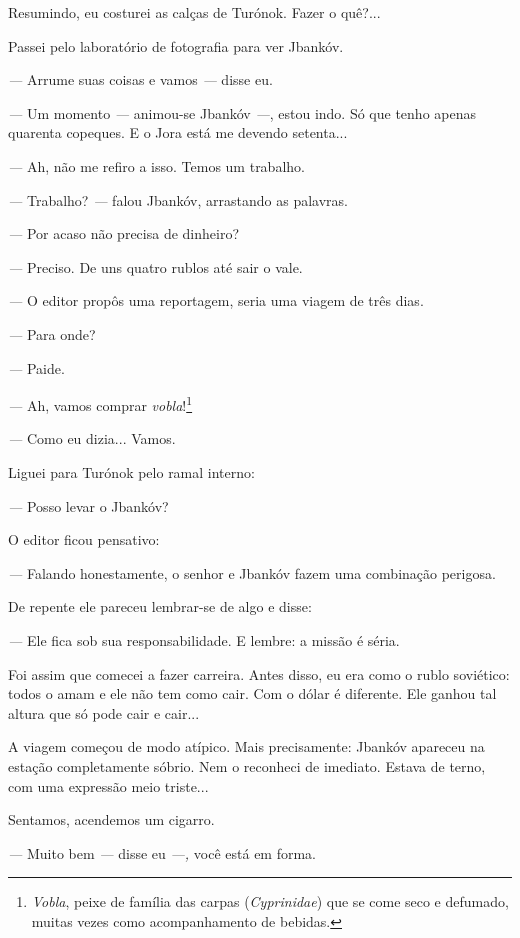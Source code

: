 Resumindo, eu costurei as calças de Turónok. Fazer o quê?...

Passei pelo laboratório de fotografia para ver Jbankóv.

\emph{---} Arrume suas coisas e vamos \emph{---} disse eu.

\emph{---} Um momento \emph{---} animou-se Jbankóv \emph{---}, estou
indo. Só que tenho apenas quarenta copeques. E o Jora está me devendo
setenta...

\emph{---} Ah, não me refiro a isso. Temos um trabalho.

\emph{---} Trabalho? \emph{---} falou Jbankóv, arrastando as palavras.

\emph{---} Por acaso não precisa de dinheiro?

\emph{---} Preciso. De uns quatro rublos até sair o vale.

\emph{---} O editor propôs uma reportagem, seria uma viagem de três
dias.

\emph{---} Para onde?

\emph{---} Paide.

\emph{---} Ah, vamos comprar \emph{vobla}!\footnote{\emph{Vobla}, peixe
  de família das carpas (\emph{Cyprinidae}) que se come seco e defumado,
  muitas vezes como acompanhamento de bebidas.}

\emph{---} Como eu dizia... Vamos.

Liguei para Turónok pelo ramal interno:

\emph{---} Posso levar o Jbankóv?

O editor ficou pensativo:

\emph{---} Falando honestamente, o senhor e Jbankóv fazem uma combinação
perigosa.

De repente ele pareceu lembrar-se de algo e disse:

\emph{---} Ele fica sob sua responsabilidade. E lembre: a missão é
séria.

Foi assim que comecei a fazer carreira. Antes disso, eu era como o rublo
soviético: todos o amam e ele não tem como cair. Com o dólar é
diferente. Ele ganhou tal altura que só pode cair e cair...

A viagem começou de modo atípico. Mais precisamente: Jbankóv apareceu na
estação completamente sóbrio. Nem o reconheci de imediato. Estava de
terno, com uma expressão meio triste...

Sentamos, acendemos um cigarro.

\emph{---} Muito bem \emph{---} disse eu \emph{---,} você está em forma.

